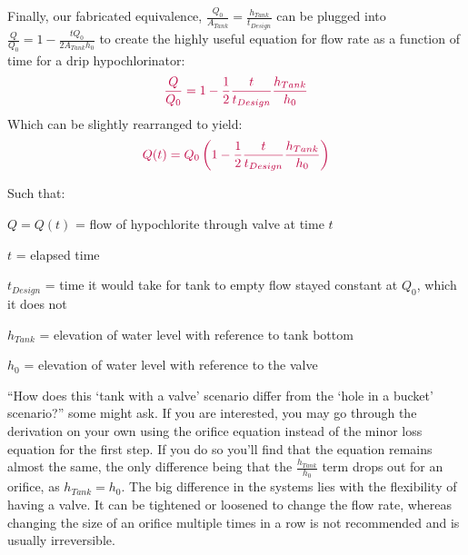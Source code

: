 \documentclass[letterpaper,10pt,english]{sphinxmanual}
\begin{document}
Finally, our fabricated equivalence, \(\frac{Q_0}{A_{Tank}} = \frac{h_{Tank}}{t_{Design}}\) can be plugged into \(\frac{Q}{Q_0} = 1 - \frac{t Q_0}{2 A_{Tank} h_0}\) to create the highly useful equation for flow rate as a function of time for a drip hypochlorinator:
\begin{equation}\label{equation:Flow_Control_and_Measurement/FCM_Derivations:Flow_Control_and_Measurement/FCM_Derivations:13}
\begin{split}\color{purple}{
\frac{Q}{Q_0} = 1 - \frac{1}{2} \frac{t}{t_{Design}} \frac{h_{Tank}}{h_0}
}\end{split}
\end{equation}
Which can be slightly rearranged to yield:
\begin{equation}\label{equation:Flow_Control_and_Measurement/FCM_Derivations:Flow_Control_and_Measurement/FCM_Derivations:14}
\begin{split}\color{purple}{
Q(t) = Q_0 \left( 1 - \frac{1}{2} \frac{t}{t_{Design}} \frac{h_{Tank}}{h_0} \right)
}\end{split}
\end{equation}
\begin{DUlineblock}{0em}
\item[] Such that:
\item[] \(Q = Q(t)\) = flow of hypochlorite through valve at time \(t\)
\item[] \(t\) = elapsed time
\item[] \(t_{Design}\) = time it would take for tank to empty  flow stayed constant at \(Q_0\), which it does not
\item[] \(h_{Tank}\) = elevation of water level with reference to tank bottom
\item[] \(h_0\) = elevation of water level with reference to the valve
\end{DUlineblock}

“How does this ‘tank with a valve’ scenario differ from the ‘hole in a bucket’ scenario?” some might ask. If you are interested, you may go through the derivation on your own using the orifice equation instead of the minor loss equation for the first step. If you do so you’ll find that the equation remains almost the same, the only difference being that the \(\frac{h_{Tank}}{h_0}\) term drops out for an orifice, as \(h_{Tank} = h_0\). The big difference in the systems lies with the flexibility of having a valve. It can be tightened or loosened to change the flow rate, whereas changing the size of an orifice multiple times in a row is not recommended and is usually irreversible.
\end{document}
